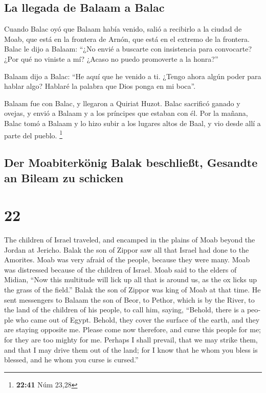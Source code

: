 \begin{paracol}{2}
\hypertarget{la-llegada-de-balaam-a-balac}{%
\subsection{La llegada de Balaam a
Balac}\label{la-llegada-de-balaam-a-balac}}

 Cuando Balac oyó que Balaam había venido, salió a
recibirlo a la ciudad de Moab, que está en la frontera de Arnón, que
está en el extremo de la frontera.  Balac le dijo a
Balaam: ``¿No envié a buscarte con insistencia para convocarte? ¿Por qué
no viniste a mí? ¿Acaso no puedo promoverte a la honra?''

 Balaam dijo a Balac: ``He aquí que he venido a ti.
¿Tengo ahora algún poder para hablar algo? Hablaré la palabra que Dios
ponga en mi boca''.

 Balaam fue con Balac, y llegaron a Quiriat Huzot.
 Balac sacrificó ganado y ovejas, y envió a Balaam y a
los príncipes que estaban con él.  Por la mañana, Balac
tomó a Balaam y lo hizo subir a los lugares altos de Baal, y vio desde
allí a parte del pueblo. \footnote{\textbf{22:41} Núm 23,28}

\switchcolumn
\begin{otherlanguage}{english}

\hypertarget{der-moabiterkuxf6nig-balak-beschlieuxdft-gesandte-an-bileam-zu-schicken-1}{%
\subsection{Der Moabiterkönig Balak beschließt, Gesandte an Bileam zu
schicken}\label{der-moabiterkuxf6nig-balak-beschlieuxdft-gesandte-an-bileam-zu-schicken-1}}

\hypertarget{section-43}{%
\section{22}\label{section-43}}

 The children of Israel traveled, and encamped in the
plains of Moab beyond the Jordan at Jericho.  Balak the
son of Zippor saw all that Israel had done to the Amorites.
 Moab was very afraid of the people, because they were
many. Moab was distressed because of the children of Israel.
 Moab said to the elders of Midian, ``Now this multitude
will lick up all that is around us, as the ox licks up the grass of the
field.'' Balak the son of Zippor was king of Moab at that time.
 He sent messengers to Balaam the son of Beor, to Pethor,
which is by the River, to the land of the children of his people, to
call him, saying, ``Behold, there is a people who came out of Egypt.
Behold, they cover the surface of the earth, and they are staying
opposite me.  Please come now therefore, and curse this
people for me; for they are too mighty for me. Perhaps I shall prevail,
that we may strike them, and that I may drive them out of the land; for
I know that he whom you bless is blessed, and he whom you curse is
cursed.''


\end{otherlanguage}
\end{paracol}
